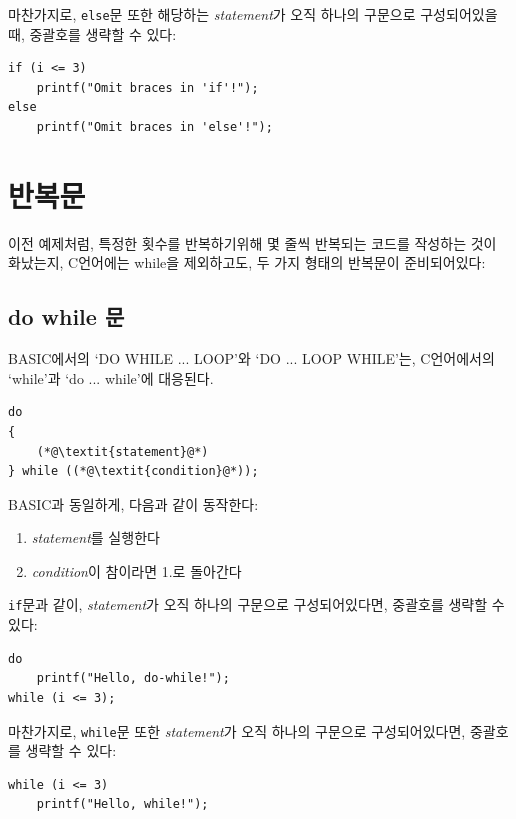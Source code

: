 \documentclass[a4paper,12pt]{book}
\newcommand{\V}[1]{\Verb|#1|}
\begin{document}
마찬가지로, \V{else}문 또한 해당하는 \textit{statement}가 오직 하나의 구문으로 구성되어있을때,
중괄호를 생략할 수 있다:

\begin{lstlisting}
if (i <= 3)
    printf("Omit braces in 'if'!");
else
    printf("Omit braces in 'else'!");
\end{lstlisting}


\section{반복문}

이전 예제처럼, 특정한 횟수를 반복하기위해 몇 줄씩 반복되는 코드를 작성하는 것이 화났는지,
C언어에는 while을 제외하고도, 두 가지 형태의 반복문이 준비되어있다:


\subsection{do while 문}

BASIC에서의 `DO WHILE ... LOOP'와 `DO ... LOOP WHILE'는,
C언어에서의 `while'과 `do ... while'에 대응된다.

\begin{lstlisting}
do
{
    (*@\textit{statement}@*)
} while ((*@\textit{condition}@*));
\end{lstlisting}

BASIC과 동일하게, 다음과 같이 동작한다:

\begin{enumerate}
    \item \textit{statement}를 실행한다
    \item \textit{condition}이 참이라면 1.로 돌아간다
\end{enumerate}

\V{if}문과 같이, \textit{statement}가 오직 하나의 구문으로 구성되어있다면,
중괄호를 생략할 수 있다:

\begin{lstlisting}
do
    printf("Hello, do-while!");
while (i <= 3);
\end{lstlisting}

마찬가지로, \V{while}문 또한 \textit{statement}가 오직 하나의 구문으로 구성되어있다면,
중괄호를 생략할 수 있다:

\begin{lstlisting}
while (i <= 3)
    printf("Hello, while!");
\end{lstlisting}
\end{document}
